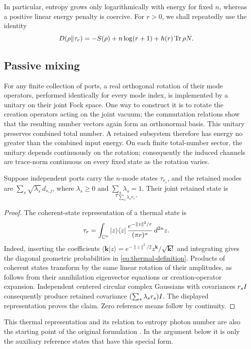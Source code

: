 In particular, entropy grows only logarithmically with energy for fixed \(n\), whereas a positive linear energy penalty is coercive. For \(r>0\), we shall repeatedly use the identity
\begin{equation}\label{eq:thermal-relative-entropy}
 D(\rho\Vert\tau_r)=-S(\rho)+n\log(r+1)+h(r)\operatorname{Tr}\rho N.
\end{equation}

\subsection{Passive mixing}
For any finite collection of ports, a real orthogonal rotation of their mode operators, performed identically for every mode index, is implemented by a unitary on their joint Fock space. One way to construct it is to rotate the creation operators acting on the joint vacuum; the commutation relations show that the resulting number vectors again form an orthonormal basis. This unitary preserves combined total number. A retained subsystem therefore has energy no greater than the combined input energy. On each finite total-number sector, the unitary depends continuously on the rotation; consequently the induced channels are trace-norm continuous on every fixed state as the rotation varies.

\begin{proposition}\label{prop:thermal-mixing}
Suppose independent ports carry the \(n\)-mode states \(\tau_{r_s}\), and the retained modes are \(\sum_s\sqrt{\lambda_s}\,d_{s,j}\), where \(\lambda_s\ge0\) and \(\sum_s\lambda_s=1\). Their joint retained state is
\[
 \tau_{\sum_s\lambda_s r_s}.
\]
\end{proposition}
\begin{proof}
The coherent-state representation of a thermal state is
\[
 \tau_r=\int_{\mathbb C^n}|z\rangle\langle z|\,
       \frac{e^{-\lVert z\rVert^2/r}}{(\pi r)^n}\,d^{2n}z.
\]
Indeed, inserting the coefficients
\(\langle\mathbf k|z\rangle=e^{-\lVert z\rVert^2/2}z^{\mathbf k}/\sqrt{\mathbf k!}\)
and integrating gives the diagonal geometric probabilities in \eqref{eq:thermal-definition}. Products of coherent states transform by the same linear rotation of their amplitudes, as follows from their annihilation eigenvector equations or creation-operator expansion. Independent centered circular complex Gaussians with covariances \(r_sI\) consequently produce retained covariance \((\sum_s\lambda_s r_s)I\). The displayed representation proves the claim. Zero reference means follow by continuity.
\end{proof}

This thermal representation and its relation to entropy photon number are also the starting point of the original formulation \cite[Section~II.B]{GES2007}. In the argument below it is only the auxiliary reference states that have this special form.
